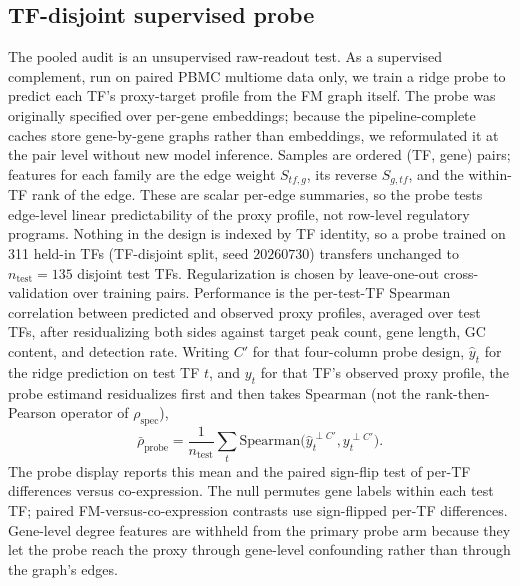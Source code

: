 \documentclass[fleqn,10pt,lineno]{wlpeerj}
\begin{document}
\subsection{TF-disjoint supervised probe}\label{sec:probe}
The pooled audit is an unsupervised raw-readout test. As a supervised complement, run on paired
PBMC multiome data only, we train a ridge
probe to predict each TF's proxy-target profile from the FM graph itself. The probe was originally
specified over per-gene embeddings; because the pipeline-complete caches store gene-by-gene graphs rather
than embeddings, we reformulated it at the pair level without new
model inference. Samples are ordered
(TF, gene) pairs; features for each family are the edge weight $S_{tf,g}$, its reverse $S_{g,tf}$,
and the within-TF rank of the edge. These are scalar per-edge summaries, so the probe tests
edge-level linear predictability of the proxy profile, not row-level regulatory programs. Nothing in the design is
indexed by TF identity, so a probe
trained on 311 held-in TFs (TF-disjoint split, seed $20260730$) transfers unchanged to
$n_{\mathrm{test}}=135$ disjoint test TFs. Regularization is chosen
by leave-one-out cross-validation over training pairs. Performance is the per-test-TF Spearman correlation
between predicted and observed proxy profiles, averaged over test TFs, after residualizing both
sides against target peak count, gene length, GC content, and detection rate.
Writing $C'$ for that four-column probe design, $\hat{y}_t$ for the ridge prediction on test TF $t$,
and $y_t$ for that TF's observed proxy profile, the probe estimand residualizes first and then
takes Spearman (not the rank-then-Pearson operator of $\rho_{\mathrm{spec}}$),
\begin{equation}
\label{eq:probe}
\bar{\rho}_{\mathrm{probe}}
=
\frac{1}{n_{\mathrm{test}}}\sum_{t}
\mathrm{Spearman}\bigl(\hat{y}_t^{\perp C'}, y_t^{\perp C'}\bigr).
\end{equation}
The probe display reports this mean and the paired sign-flip test of per-TF differences versus co-expression.
The null permutes
gene labels within each test TF; paired FM-versus-co-expression contrasts use sign-flipped
per-TF differences. Gene-level degree features are withheld from the primary probe arm because
they let the probe reach the proxy through gene-level confounding rather than through the graph's
edges.
\end{document}
